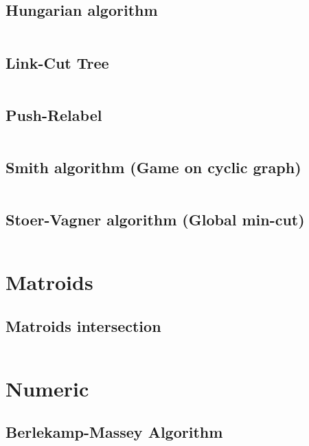 \documentclass{article}
\begin{document}
\subsection{Hungarian algorithm}
\inputminted[mathescape, breaklines, breakafter=(, tabsize=2, frame=lines, showtabs, tab=|\ , tabcolor=lightgray]{c++}{./graphs/hungarian-algorithm/hungarian-algorithm.cpp}
\subsection{Link-Cut Tree}
\inputminted[mathescape, breaklines, breakafter=(, tabsize=2, frame=lines, showtabs, tab=|\ , tabcolor=lightgray]{c++}{./graphs/link-cut-tree/link-cut-tree.cpp}
\subsection{Push-Relabel}
\inputminted[mathescape, breaklines, breakafter=(, tabsize=2, frame=lines, showtabs, tab=|\ , tabcolor=lightgray]{c++}{./graphs/push-relabel/push-relabel.cpp}
\subsection{Smith algorithm (Game on cyclic graph)}
\inputminted[mathescape, breaklines, breakafter=(, tabsize=2, frame=lines, showtabs, tab=|\ , tabcolor=lightgray]{c++}{./graphs/smith/smith.cpp}
\subsection{Stoer-Vagner algorithm (Global min-cut)}
\inputminted[mathescape, breaklines, breakafter=(, tabsize=2, frame=lines, showtabs, tab=|\ , tabcolor=lightgray]{c++}{./graphs/stoer-vagner/stoer-vagner.cpp}
\section{Matroids}
\subsection{Matroids intersection}
\inputminted[mathescape, breaklines, breakafter=(, tabsize=2, frame=lines, showtabs, tab=|\ , tabcolor=lightgray]{c++}{./matroids/matroids-intersection/matroids-intersection.cpp}
\section{Numeric}
\subsection{Berlekamp-Massey Algorithm}
\inputminted[mathescape, breaklines, breakafter=(, tabsize=2, frame=lines, showtabs, tab=|\ , tabcolor=lightgray]{c++}{./numeric/berlekamp/berlekamp.cpp}
\end{document}
